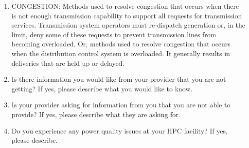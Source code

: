 \begin{enumerate}
\item
CONGESTION: Methods used to resolve congestion that occurs when there is not enough 
transmission capability to support all requests for transmission services. Transmission 
system operators must re-dispatch generation or, in the limit, deny some of these 
requests to prevent transmission lines from becoming overloaded. Or, methods used to resolve 
congestion that occurs when the distribution control system is overloaded. It generally 
results in deliveries that are held up or delayed. 

\item
Is there information you would like from your provider that you are not getting? If yes, 
please describe what you would like to know.

\item
Is your provider asking for information from you that you are not able to provide? If yes, 
please describe what they are asking for.

\item
Do you experience any power quality issues at your HPC facility? If yes, please describe.

\end{enumerate}

